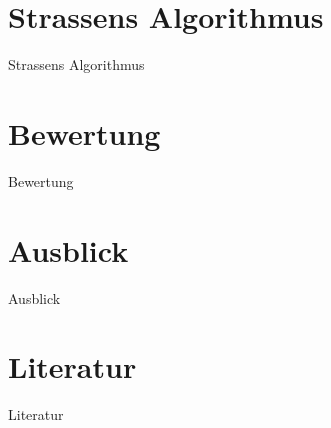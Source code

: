 \documentclass{beamer}
\begin{document}
\section{Strassens Algorithmus}
\begin{frame}{Strassens Algorithmus}
    
\end{frame}

\section{Bewertung}
\begin{frame}{Bewertung}
    
\end{frame}

\section{Ausblick}
\begin{frame}{Ausblick}
    
\end{frame}

\section{Literatur}
\begin{frame}{Literatur}
    \nocite{*}
    
    
\end{frame}
\end{document}
